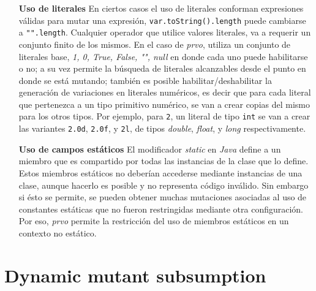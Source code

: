 \begin{enumerate}[leftmargin=.75cm,align=left]
	\item[\textbf{Uso de literales}] En ciertos casos el uso de literales conforman expresiones v\'alidas para mutar una expresi\'on, \lstinline|var.toString().length| puede cambiarse a \lstinline|"".length|. Cualquier operador que utilice valores literales, va a requerir un conjunto finito de los mismos. En el caso de \emph{prvo}, utiliza un conjunto de literales base, \emph{1, 0, True, False, "", null} en donde cada uno puede habilitarse o no; a su vez permite la b\'usqueda de literales alcanzables desde el punto en donde se est\'a mutando; tambi\'en es posible habilitar/deshabilitar la generaci\'on de variaciones en literales num\'ericos, es decir que para cada literal que pertenezca a un tipo primitivo num\'erico, se van a crear copias del mismo para los otros tipos. Por ejemplo, para \texttt{2}, un literal de tipo \texttt{int} se van a crear las variantes \texttt{2.0d}, \texttt{2.0f}, y \texttt{2l}, de tipos \emph{double}, \emph{float}, y \emph{long} respectivamente.
	
	\item[\textbf{Uso de campos est\'aticos}] El modificador \emph{static} en \emph{Java} define a un miembro que es compartido por todas las instancias de la clase que lo define. Estos miembros est\'aticos no deber\'ian accederse mediante instancias de una clase, aunque hacerlo es posible y no representa c\'odigo inv\'alido. Sin embargo si \'esto se permite, se pueden obtener muchas mutaciones asociadas al uso de constantes est\'aticas que no fueron restringidas mediante otra configuraci\'on. Por eso, \emph{prvo} permite la restricci\'on del uso de miembros est\'aticos en un contexto no est\'atico.
\end{enumerate}

\section{Dynamic mutant subsumption}
\label{sec:implementation.dynamicSubsumption}

